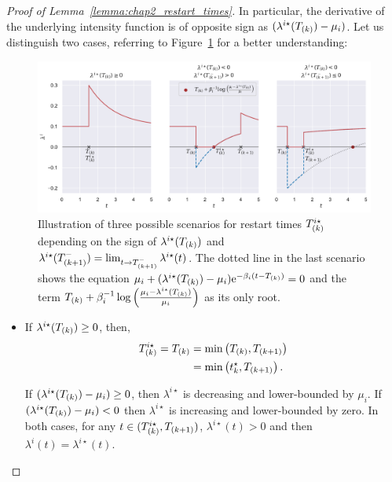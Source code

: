 \begin{subappendices}
\begin{proof}[Proof of Lemma~\ref{lemma:chap2_restart_times}]
        In particular, the derivative of the underlying intensity function is of opposite sign as $(\lambda^{i\star}(T\park) - \mu_i)$.
        Let us distinguish two cases,
        referring to Figure~\ref{fig:chap2_lemma} for a better understanding:
        
        {\begin{figure}[!ht]
        \centering
        \includegraphics[width=\linewidth]{images/chapter3/cooldownTimesMarkedMulti.pdf}
        \caption{Illustration of three possible scenarios for restart times $T\park^{i\star}$ depending on the sign of $\lambda^{i\star}(T\park)$ and $\lambda^{i\star}(T\park[k+1]^-) = \lim_{t\to T\park[k+1]^-}{\lambda^{i\star}(t)}$. The dotted line in the last scenario shows the equation $\mu_i + (\lambda^{i\star}(T\park) - \mu_i)\mathrm{e}^{-\beta_i(t-T\park)} = 0$ and the term $T\park + \beta_i^{-1}\log{\adaptedpar{\frac{\mu_i - \lambda^{i\star}(T\park)}{\mu_i}}}$ as its only root.}
        \label{fig:chap2_lemma}
        \end{figure}}
  
        \begin{itemize}
            \item If $\lambda^{i\star}(T\park) \geq 0$, then,
            \begin{align*}
              T^{i\star}\park = T\park &= \min{\adaptedpar{T\park, T\park[k+1]}} \\
              &= \min{\adaptedpar{t^\star_k, T\park[k+1]}}\,.
            \end{align*}
  
            If $(\lambda^{i\star}(T\park) - \mu_i) \geq 0$, then $\lambda^{i\star}$ is decreasing and lower-bounded by $\mu_i$. If $(\lambda^{i\star}(T\park) - \mu_i) < 0$ then $\lambda^{i\star}$ is increasing and lower-bounded by zero. In both cases, for any $t\in(T^{i\star}\park, T\park[k+1])$, $\lambda^{i\star}(t) > 0$ and then $\lambda^i(t) = \lambda^{i\star}(t)$.
  

\end{itemize}
\end{proof}
\end{subappendices}
